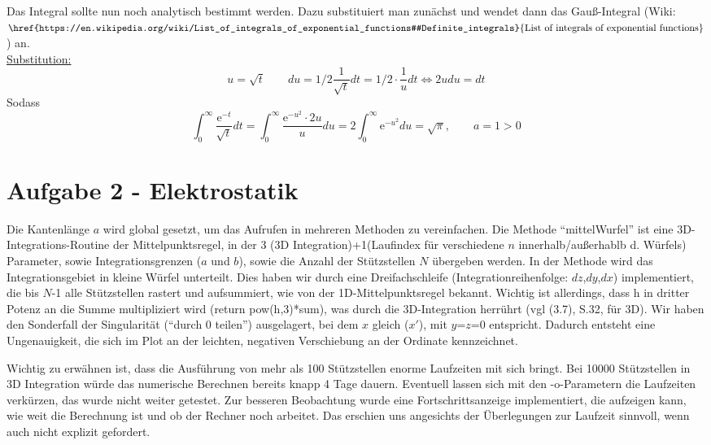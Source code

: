 Das Integral sollte nun noch analytisch bestimmt werden. Dazu substituiert man zunächst und wendet dann das Gauß-Integral (Wiki: $\href{https://en.wikipedia.org/wiki/List_of_integrals_of_exponential_functions#Definite_integrals}{\text{List of integrals of exponential functions}}$) an.\\
\underline{Substitution:}
\begin{equation*}
u = \sqrt{t} \qquad du = 1/2 \frac{1}{\sqrt{t}} dt = 1/2 \cdot \frac{1}{u} dt \Leftrightarrow 2udu = dt
\end{equation*}
Sodass
\begin{equation*}
\int_0^{\infty} \frac{\mathup{e}^{-t}}{\sqrt{t}} dt = \int_0^{\infty} \frac{\mathup{e}^{-u^2}\cdot 2u}{u} du = 2 \int_0^{\infty} \mathup{e}^{-u^2} du = \sqrt{\pi}, \qquad a=1>0
\end{equation*}




\section*{Aufgabe 2 - Elektrostatik}
Die Kantenlänge $a$ wird global gesetzt, um das Aufrufen in mehreren Methoden zu vereinfachen. Die Methode \enquote{mittelWurfel} ist eine 3D-Integrations-Routine der Mittelpunktsregel, in der 3 (3D Integration)+1(Laufindex für verschiedene $n$ innerhalb/außerhablb d. Würfels) Parameter, sowie Integrationsgrenzen ($a$ und $b$), sowie die Anzahl der Stützstellen $N$ übergeben werden. In der Methode wird das Integrationsgebiet in kleine Würfel unterteilt. Dies haben wir durch eine Dreifachschleife (Integrationreihenfolge: $dz$,$dy$,$dx$) implementiert, die bis $N$-1 alle Stützstellen rastert und aufsummiert, wie von der 1D-Mittelpunktsregel bekannt. Wichtig ist allerdings, dass h in dritter Potenz an die Summe multipliziert wird (return pow(h,3)*sum), was durch die 3D-Integration herrührt (vgl (3.7), S.32, für 3D).
Wir haben den Sonderfall der Singularität (\enquote{durch 0 teilen}) ausgelagert, bei dem $x$ gleich ($x'$), mit $y$=$z$=0 entspricht. Dadurch entsteht eine Ungenauigkeit, die sich im Plot an der leichten, negativen Verschiebung an der Ordinate kennzeichnet.

Wichtig zu erwähnen ist, dass die Ausführung von mehr als 100 Stützstellen enorme Laufzeiten mit sich bringt. Bei 10000 Stützstellen in 3D Integration würde das numerische Berechnen bereits knapp 4 Tage dauern. Eventuell lassen sich mit den -o-Parametern die Laufzeiten verkürzen, das wurde nicht weiter getestet. Zur besseren Beobachtung wurde eine Fortschrittsanzeige implementiert, die aufzeigen kann, wie weit die Berechnung ist und ob der Rechner noch arbeitet. Das erschien uns angesichts der Überlegungen zur Laufzeit sinnvoll, wenn auch nicht explizit gefordert.
